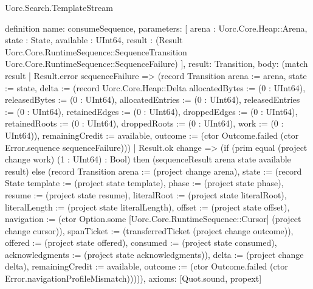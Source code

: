 \begin{lexlean}{Uorc.Search.TemplateStream}
\begin{semanticmodule}
definition{
  name: consumeSequence,
  parameters: [
    arena : Uorc.Core.Heap::Arena,
    state : State,
    available : UInt64,
    result : (Result Uorc.Core.RuntimeSequence::SequenceTransition Uorc.Core.RuntimeSequence::SequenceFailure)
  ],
  result: Transition,
  body: (match result
    | Result.error sequenceFailure => (record Transition {arena := arena, state := state, delta := (record Uorc.Core.Heap::Delta {allocatedBytes := (0 : UInt64), releasedBytes := (0 : UInt64), allocatedEntries := (0 : UInt64), releasedEntries := (0 : UInt64), retainedEdges := (0 : UInt64), droppedEdges := (0 : UInt64), retainedRoots := (0 : UInt64), droppedRoots := (0 : UInt64), work := (0 : UInt64)}), remainingCredit := available, outcome := (ctor Outcome.failed (ctor Error.sequence sequenceFailure))})
    | Result.ok change => (if (prim equal (project change work) (1 : UInt64) : Bool) then (sequenceResult arena state available result) else (record Transition {arena := (project change arena), state := (record State {template := (project state template), phase := (project state phase), resume := (project state resume), literalRoot := (project state literalRoot), literalLength := (project state literalLength), offset := (project state offset), navigation := (ctor Option.some [Uorc.Core.RuntimeSequence::Cursor] (project change cursor)), spanTicket := (transferredTicket (project change outcome)), offered := (project state offered), consumed := (project state consumed), acknowledgments := (project state acknowledgments)}), delta := (project change delta), remainingCredit := available, outcome := (ctor Outcome.failed (ctor Error.navigationProfileMismatch))}))),
  axioms: [Quot.sound, propext]
}


\end{semanticmodule}
\end{lexlean}
